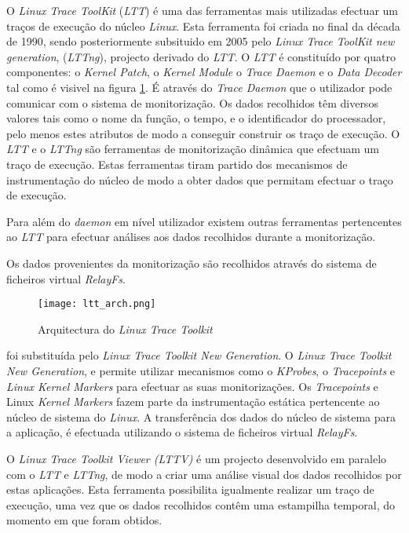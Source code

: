 O \textit{Linux Trace ToolKit} (\textit{LTT}) é uma das ferramentas mais utilizadas efectuar um traços de execução do núcleo \textit{Linux}.
Esta ferramenta foi criada no final da década de 1990, sendo posteriormente subsituido em 2005 pelo \textit{Linux Trace ToolKit new generation}, (\textit{LTTng}), projecto derivado do \textit{LTT}.
O \textit{LTT} é constituído por quatro componentes: o \textit{Kernel Patch}, o \textit{Kernel Module} o \textit{Trace Daemon} e o \textit{Data Decoder} tal como é visivel na figura \ref{fig:ltt_arch}.
É através do \textit{Trace Daemon} que o utilizador pode comunicar com o sistema de monitorização.
Os dados recolhidos têm diversos valores tais como o nome da função, o tempo, e o identificador do processador, pelo menos estes atributos de modo a conseguir construir os traço de execução.
O \textit{LTT} e o \textit{LTTng} são ferramentas de monitorização dinâmica que efectuam um traço de execução.
Estas ferramentas tiram partido dos mecanismos de instrumentação do núcleo de modo a obter dados que permitam efectuar o traço de execução.

Para além do \textit{daemon} em nível utilizador existem outras ferramentas pertencentes ao \textit{LTT} para efectuar análises aos dados recolhidos durante a monitorização.

Os dados provenientes da monitorização são recolhidos através do sistema de ficheiros virtual \textit{RelayFs}.

\begin{figure}[!htb]
       \centering
       \texttt{[image: ltt\_arch.png]}
       \caption{Arquitectura do \textit{Linux Trace Toolkit} \cite{Yaghmour:2000:MCS:1267724.1267726}}
	\label{fig:ltt_arch}
\end{figure}

\cite{Yaghmour:2000:MCS:1267724.1267726}
foi substituída pelo \textit{Linux Trace Toolkit New Generation}.
O \textit{Linux Trace Toolkit New Generation}, e permite utilizar mecanismos como o \textit{KProbes}, o \textit{Tracepoints}\cite{Mathieu2009} e \textit{Linux Kernel Markers}\cite{Mathieu2009} para efectuar as suas monitorizações.
Os \textit{Tracepoints} e Linux \textit{Kernel Markers} fazem parte da instrumentação estática pertencente ao núcleo de sistema do \textit{Linux}.
A transferência dos dados do núcleo de sistema para a aplicação, é efectuada utilizando o sistema de ficheiros virtual \textit{RelayFs}.

O \textit{Linux Trace Toolkit Viewer (LTTV)} é um projecto desenvolvido em paralelo com o \textit{LTT} e \textit{LTTng}, de modo a criar uma análise visual dos dados recolhidos por estas aplicações.
Esta ferramenta possibilita igualmente realizar um traço de execução, uma vez que os dados recolhidos contêm uma estampilha temporal, do momento em que foram obtidos.
 
